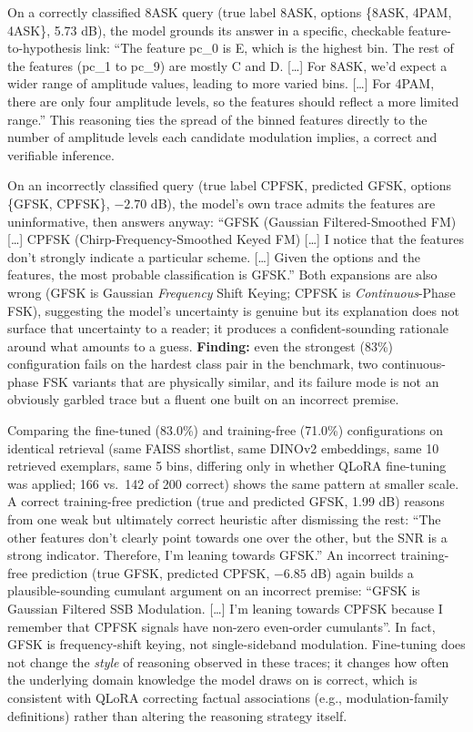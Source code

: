 On a correctly classified 8ASK query (true label 8ASK, options \{8ASK, 4PAM, 4ASK\}, 5.73 dB), the model grounds its answer in a specific, checkable feature-to-hypothesis link: ``The feature pc\_0 is E, which is the highest bin. The rest of the features (pc\_1 to pc\_9) are mostly C and D. [\ldots] For 8ASK, we'd expect a wider range of amplitude values, leading to more varied bins. [\ldots] For 4PAM, there are only four amplitude levels, so the features should reflect a more limited range.'' This reasoning ties the spread of the binned features directly to the number of amplitude levels each candidate modulation implies, a correct and verifiable inference.

On an incorrectly classified query (true label CPFSK, predicted GFSK, options \{GFSK, CPFSK\}, $-2.70$ dB), the model's own trace admits the features are uninformative, then answers anyway: ``GFSK (Gaussian Filtered-Smoothed FM) [\ldots] CPFSK (Chirp-Frequency-Smoothed Keyed FM) [\ldots] I notice that the features don't strongly indicate a particular scheme. [\ldots] Given the options and the features, the most probable classification is GFSK.'' Both expansions are also wrong (GFSK is Gaussian \emph{Frequency} Shift Keying; CPFSK is \emph{Continuous}-Phase FSK), suggesting the model's uncertainty is genuine but its explanation does not surface that uncertainty to a reader; it produces a confident-sounding rationale around what amounts to a guess. \textbf{Finding:} even the strongest (83\%) configuration fails on the hardest class pair in the benchmark, two continuous-phase FSK variants that are physically similar, and its failure mode is not an obviously garbled trace but a fluent one built on an incorrect premise.

Comparing the fine-tuned (83.0\%) and training-free (71.0\%) configurations on identical retrieval (same FAISS shortlist, same DINOv2 embeddings, same 10 retrieved exemplars, same 5 bins, differing only in whether QLoRA fine-tuning was applied; 166 vs.\ 142 of 200 correct) shows the same pattern at smaller scale. A correct training-free prediction (true and predicted GFSK, 1.99 dB) reasons from one weak but ultimately correct heuristic after dismissing the rest: ``The other features don't clearly point towards one over the other, but the SNR is a strong indicator. Therefore, I'm leaning towards GFSK.'' An incorrect training-free prediction (true GFSK, predicted CPFSK, $-6.85$ dB) again builds a plausible-sounding cumulant argument on an incorrect premise: ``GFSK is Gaussian Filtered SSB Modulation. [\ldots] I'm leaning towards CPFSK because I remember that CPFSK signals have non-zero even-order cumulants''. In fact, GFSK is frequency-shift keying, not single-sideband modulation. Fine-tuning does not change the \emph{style} of reasoning observed in these traces; it changes how often the underlying domain knowledge the model draws on is correct, which is consistent with QLoRA correcting factual associations (e.g., modulation-family definitions) rather than altering the reasoning strategy itself.

